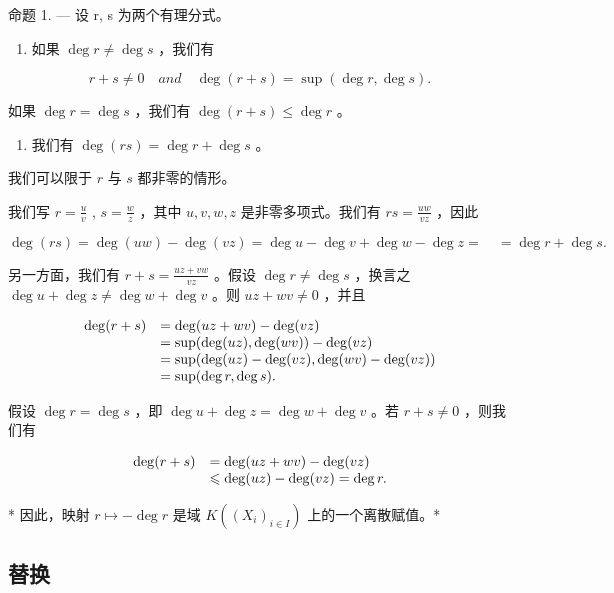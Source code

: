命题 1. --- 设 r, s 为两个有理分式。

\begin{enumerate}
\def\labelenumi{(\roman{enumi})}
\tightlist
\item
  如果 \(\deg r \neq \deg s\) ，我们有
\end{enumerate}

\[
r + s \neq 0 \quad a n d \quad \deg (r + s) = \sup (\deg r, \deg s).
\]

如果 \(\deg r = \deg s\) ，我们有 \(\deg (r + s) \leqslant \deg r\) 。

\begin{enumerate}
\def\labelenumi{(\roman{enumi})}
\setcounter{enumi}{1}
\tightlist
\item
  我们有 \(\deg(rs) = \deg r + \deg s\) 。
\end{enumerate}

我们可以限于 \(r\) 与 \(s\) 都非零的情形。

我们写 \(r = \frac{u}{v}\) , \(s = \frac{w}{z}\) ，其中 \(u, v, w, z\) 是非零多项式。我们有 \(rs = \frac{uw}{vz}\) ，因此

\[
\deg (r s) = \deg (u w) - \deg (v z) = \deg u - \deg v + \deg w - \deg z = \quad = \deg r + \deg s.
\]

另一方面，我们有 \(r + s = \frac{uz + vw}{vz}\) 。假设 \(\deg r \neq \deg s\) ，换言之 \(\deg u + \deg z \neq \deg w + \deg v\) 。则 \(uz + wv \neq 0\) ，并且

\[
\begin{array}{r l} \deg (r + s) & = \deg (u z + w v) - \deg (v z) \\ & = \sup (\deg (u z), \deg (w v)) - \deg (v z) \\ & = \sup (\deg (u z) - \deg (v z), \deg (w v) - \deg (v z)) \\ & = \sup (\deg r, \deg s). \end{array}
\]

假设 \(\deg r = \deg s\) ，即 \(\deg u + \deg z = \deg w + \deg v\) 。若 \(r + s \neq 0\) ，则我们有

\[
\begin{array}{r l} \deg (r + s) & = \deg (u z + w v) - \deg (v z) \\ & \leqslant \deg (u z) - \deg (v z) = \deg r. \end{array}
\]

* 因此，映射 \(r \mapsto -\deg r\) 是域 \(K((X_i)_{i \in I})\) 上的一个离散赋值。*

\subsection{替换}

